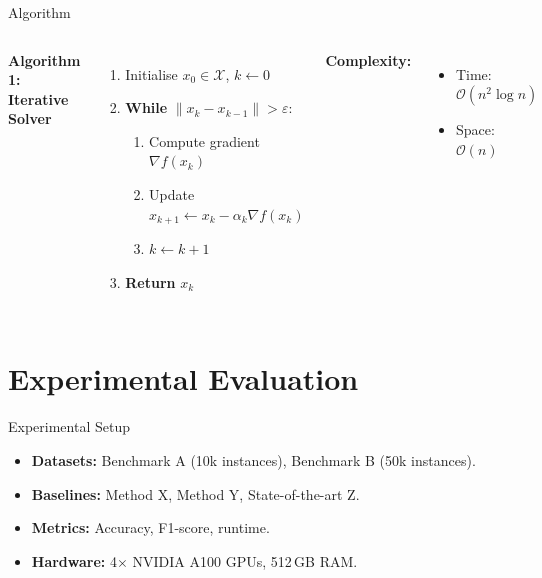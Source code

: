 \documentclass[aspectratio=169]{beamer}
\begin{document}
\begin{frame}{Algorithm}
  \begin{columns}
    \textbf{Algorithm 1: Iterative Solver}
    \begin{enumerate}
      \item Initialise $x_0 \in \mathcal{X}$, $k \leftarrow 0$
      \item \textbf{While} $\|x_k - x_{k-1}\| > \varepsilon$:
        \begin{enumerate}
          \item Compute gradient $\nabla f(x_k)$
          \item Update $x_{k+1} \leftarrow x_k - \alpha_k \nabla f(x_k)$
          \item $k \leftarrow k+1$
        \end{enumerate}
      \item \textbf{Return} $x_k$
    \end{enumerate}

    \textbf{Complexity:}
    \begin{itemize}
      \item Time: $\mathcal{O}(n^2 \log n)$
      \item Space: $\mathcal{O}(n)$
    \end{itemize}
  \end{columns}
\end{frame}

\section{Experimental Evaluation}

\begin{frame}{Experimental Setup}
  \begin{itemize}
    \item \textbf{Datasets:} Benchmark A (10k instances), Benchmark B (50k instances).
    \item \textbf{Baselines:} Method X, Method Y, State-of-the-art Z.
    \item \textbf{Metrics:} Accuracy, F1-score, runtime.
    \item \textbf{Hardware:} 4$\times$ NVIDIA A100 GPUs, 512\,GB RAM.
  \end{itemize}
\end{frame}
\end{document}
